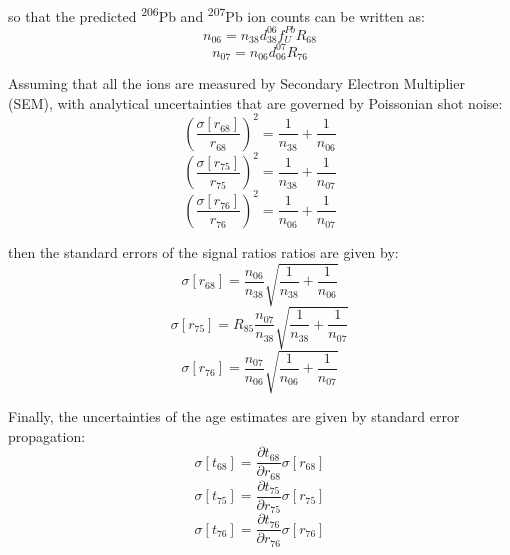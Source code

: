 \documentclass[gchron, manuscript]{copernicus}
\begin{document}
so that the predicted \textsuperscript{206}Pb and
\textsuperscript{207}Pb ion counts can be written as:
\begin{equation}
    n_{06} = n_{38}d^{06}_{38}f^{Pb}_{U}R_{68}
\end{equation}
\begin{equation}  
    n_{07} = n_{06}d^{07}_{06}R_{76}
\end{equation}

Assuming that all the ions are measured by Secondary Electron
Multiplier (SEM), with analytical uncertainties that are governed by
Poissonian shot noise:
\begin{equation}
    \left(\frac{\sigma[r_{68}]}{r_{68}}\right)^2 =
    \frac{1}{n_{38}} + \frac{1}{n_{06}}
\end{equation}
\begin{equation}  
    \left(\frac{\sigma[r_{75}]}{r_{75}}\right)^2 =
    \frac{1}{n_{38}} + \frac{1}{n_{07}}
\end{equation}
\begin{equation}  
    \left(\frac{\sigma[r_{76}]}{r_{76}}\right)^2 =
    \frac{1}{n_{06}} + \frac{1}{n_{07}}
\end{equation}

then the standard errors of the signal ratios ratios are given by:
\begin{equation}
    \sigma[r_{68}] = \frac{n_{06}}{n_{38}}
    \sqrt{\frac{1}{n_{38}} + \frac{1}{n_{06}}}
\end{equation}
\begin{equation}  
    \sigma[r_{75}] = R_{85} \frac{n_{07}}{n_{38}}
    \sqrt{\frac{1}{n_{38}} + \frac{1}{n_{07}}}
\end{equation}
\begin{equation}  
    \sigma[r_{76}] = \frac{n_{07}}{n_{06}}
    \sqrt{\frac{1}{n_{06}} + \frac{1}{n_{07}}}
\end{equation}

Finally, the uncertainties of the age estimates are given by standard
error propagation:
\begin{equation}
    \sigma[t_{68}] = \frac{\partial{t_{68}}}{\partial{r_{68}}} \sigma[r_{68}]
\end{equation}
\begin{equation}  
    \sigma[t_{75}] = \frac{\partial{t_{75}}}{\partial{r_{75}}} \sigma[r_{75}]
\end{equation}
\begin{equation}  
    \sigma[t_{76}] = \frac{\partial{t_{76}}}{\partial{r_{76}}} \sigma[r_{76}]
\end{equation}
\end{document}
